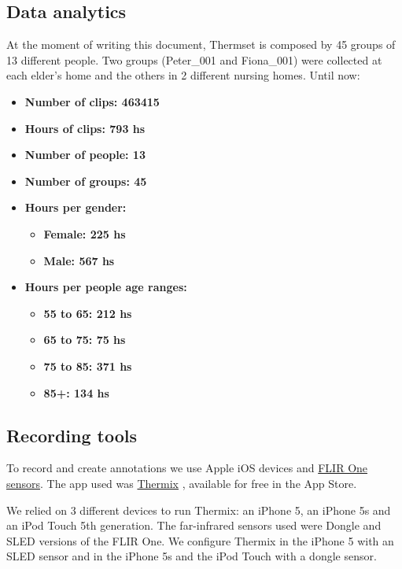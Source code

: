 \documentclass[oneside, twocolumn]{article}
\newcommand\NumberOfGroups{45}
\newcommand\TotalHoursOfRecording{793}
\newcommand\NumberOfPeople{13}
\newcommand\NumberOfClips{463415}
\newcommand\FemaleHours{225}
\newcommand\MaleHours{567}
\newcommand\LessThanSixtyFive{212}
\newcommand\LessThanSeventyFive{75}
\newcommand\LessThanEightyFive{371}
\newcommand\MoreThanEightyFive{134}
\begin{document}
\subsection{Data analytics}
At the moment of writing this document, Thermset is composed by \NumberOfGroups{} groups of \NumberOfPeople{} different people.
Two groups (Peter\_001 and Fiona\_001) were collected at each elder's home and the others in 2 different
nursing homes. Until now:

\begin{itemize}
	\item \textbf{Number of clips: \NumberOfClips{}}
  \item \textbf{Hours of clips: \TotalHoursOfRecording{} hs}
  \item \textbf{Number of people: \NumberOfPeople{}}
  \item \textbf{Number of groups: \NumberOfGroups{}}
  \item \textbf{Hours per gender:}
  \begin{itemize}
    \item \textbf{Female: \FemaleHours{} hs}
    \item \textbf{Male: \MaleHours{} hs}
  \end{itemize}
  \item \textbf{Hours per people age ranges:}
  \begin{itemize}
    \item \textbf{55 to 65: \LessThanSixtyFive{} hs}
    \item \textbf{65 to 75: \LessThanSeventyFive{} hs}
    \item \textbf{75 to 85: \LessThanEightyFive{} hs}
    \item \textbf{85+: \MoreThanEightyFive{} hs}
  \end{itemize}
\end{itemize}

\subsection{Recording tools}
To record and create annotations we use Apple iOS devices and \href{http://www.flir.com/flirone/ios/}{FLIR One sensors}.
The app used was \href{http://appstore.com/thermixforflirone}{Thermix}\cite{thermix} ,
available for free in the App Store.

We relied on 3 different devices to run Thermix: an iPhone 5, an iPhone 5s and an iPod Touch 5th generation.
The far-infrared sensors used were Dongle and SLED versions of the FLIR One.
We configure Thermix in the iPhone 5 with an SLED sensor and in the iPhone 5s and the
iPod Touch with a dongle sensor\cite{sdk_flir_dongle}\cite{sdk_flir_sled}.
\end{document}
